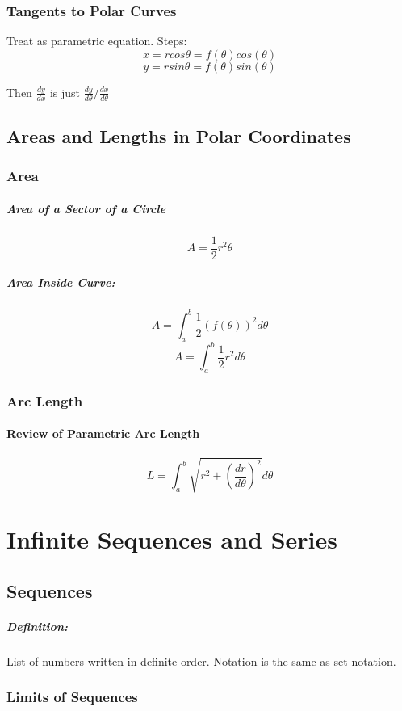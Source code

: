 \documentclass[a4paper,12pt]{report}
\begin{document}
\subsection{Tangents to Polar Curves}
Treat as parametric equation. Steps:
$$ x = r cos \theta = f(\theta) cos (\theta)$$
$$ y = r sin \theta = f(\theta) sin (\theta)$$

Then $\frac{dy}{dx}$ is just $\frac{dy}{d\theta}/\frac{dx}{d\theta}$

\section{Areas and Lengths in Polar Coordinates}
\subsection{Area}
\paragraph{Area of a Sector of a Circle}
$$A = \frac{1}{2}r^2\theta$$
\paragraph{Area Inside Curve: }
$$A = \int_a^b \frac{1}{2} (f(\theta))^2 d\theta $$
$$A = \int_a^b \frac{1}{2} r^2 d\theta $$

\subsection{Arc Length}
\subsubsection{Review of Parametric Arc Length}
$$L = \int_a^b \sqrt{r^2 + (\frac{dr}{d\theta})^2 } d\theta$$


\chapter{Infinite Sequences and Series}
\section{Sequences}
\paragraph{Definition: } List of numbers written in definite order. Notation is the same as set notation.
\subsection{Limits of Sequences}
\end{document}
